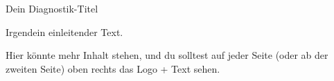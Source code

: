 \documentclass[12pt]{scrartcl}
\begin{document}
{\huge Dein Diagnostik-Titel}\par
\vspace{1em}
\normalsize
Irgendein einleitender Text.

\bigskip

Hier könnte mehr Inhalt stehen, 
und du solltest auf jeder Seite (oder ab der zweiten Seite) 
oben rechts das Logo + Text sehen.
\end{document}
